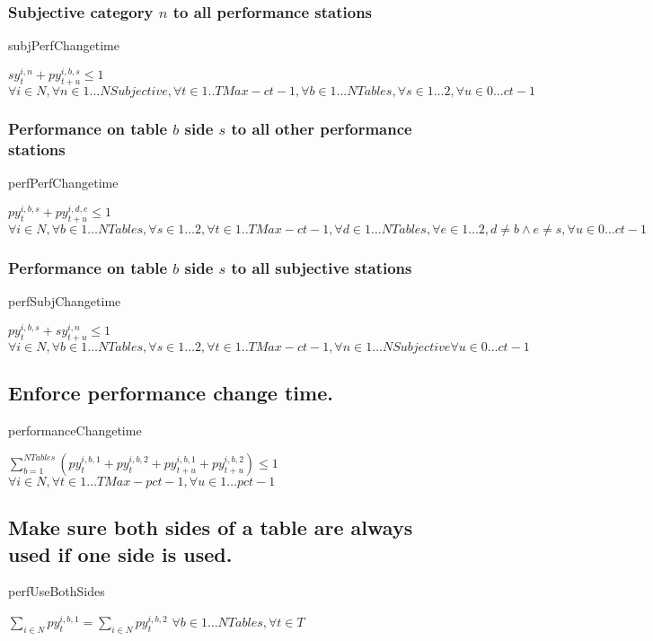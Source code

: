 \documentclass[letterpaper,11pt]{report}
\begin{document}
\subsubsection{Subjective category $n$ to all performance stations}
\begin{algorithm}
\caption{subjPerfChangetime}
$sy_{t}^{i,n} + py_{t+u}^{i,b,s} \le 1$
\hfill $\forall i \in N,
\forall n \in 1 \dots NSubjective, 
\forall t \in 1..{TMax- ct-1},
\forall b \in 1 \dots NTables,
\forall s \in 1 \dots 2,
\forall u \in 0 \dots ct-1
$
\end{algorithm}

\subsubsection{Performance on table $b$ side $s$ to all other performance
  stations}
\begin{algorithm}
\caption{perfPerfChangetime}
$py_{t}^{i,b,s} + py_{t+u}^{i,d,e} \le 1$
\hfill $\forall i \in N,
\forall b \in 1 \dots NTables,
\forall s \in 1 \dots 2,
\forall t \in 1..{TMax- ct-1},
\forall d \in 1 \dots NTables ,
\forall e \in 1 \dots 2,
d \neq b  \wedge e \neq s,
\forall u \in 0 \dots ct-1$
\end{algorithm}

\subsubsection{Performance on table $b$ side $s$ to all subjective
  stations}
\begin{algorithm}
\caption{perfSubjChangetime}
$py_{t}^{i,b,s} + sy_{t+u}^{i,n} \le 1$
\hfill $\forall i \in N,
\forall b \in 1 \dots NTables,
\forall s \in 1 \dots 2,
\forall t \in 1..{TMax-ct-1},
\forall n \in 1 \dots NSubjective
\forall u \in 0 \dots ct-1$
\end{algorithm}

\FloatBarrier
\subsection{Enforce performance change time.}
\begin{algorithm}
\caption{performanceChangetime}
$
\sum\limits_{b=1}^{NTables} (
py_{t}^{i,b,1} + py_{t}^{i,b,2}
+
py_{t+u}^{i,b,1} + py_{t+u}^{i,b,2})
\le 1$
\hfill $\forall i \in N, 
\forall t \in 1 \dots TMax- pct-1,
\forall u \in 1 \dots pct-1$
\end{algorithm}

\FloatBarrier
\subsection{Make sure both sides of a table are always used if one side is
  used.}
\begin{algorithm}
\caption{perfUseBothSides}
$\sum\limits_{i \in N} py_{t}^{i,b,1} = \sum\limits_{i \in N}py_{t}^{i,b,2}$
\hfill $
\forall b \in 1 \dots NTables,
\forall t \in T$
\end{algorithm}
\end{document}
